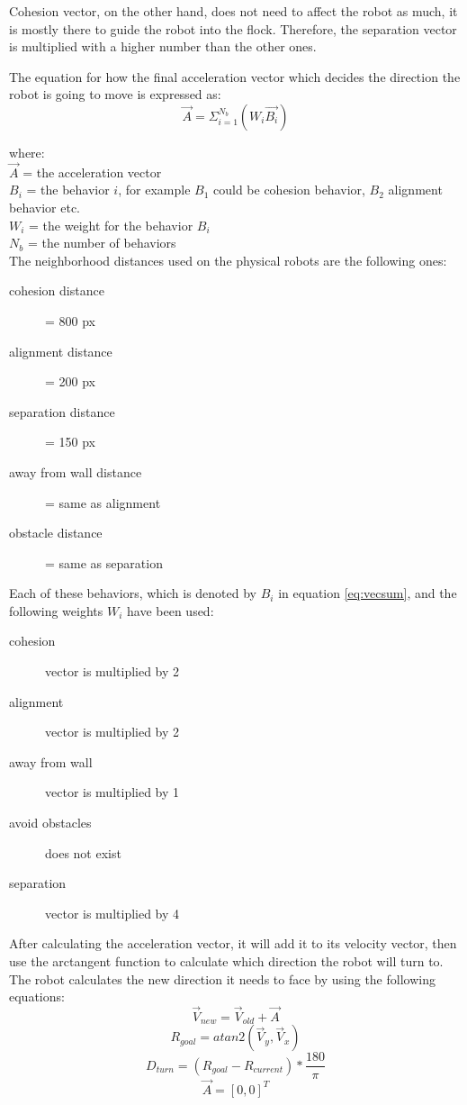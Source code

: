 Cohesion vector, on the other hand, does not need to affect the robot as much, it is mostly there to guide the robot into the flock. Therefore, the separation vector is multiplied with a higher number than the other ones.


The equation for how the final acceleration vector which decides the direction the robot is going to move is expressed as: 
\begin{equation}
\label{eq:vecsum}
\vec{A} = \Sigma_{i=1}^{N_b}(W_i\vec{B_i})
\end{equation}

where:
\\
$\vec{A}$ = the acceleration vector
\\
$B_i$ = the behavior $i$, for example $B_1$ could be cohesion behavior, $B_2$ alignment behavior etc.
\\
$W_i$ = the weight for the behavior $B_i$\\
$N_b$ = the number of behaviors\\

The neighborhood distances used on the physical robots are the following ones:
\begin{description}
\item[cohesion distance] = 800 px
\item[alignment distance] = 200 px
\item[separation distance] = 150 px
\item[away from wall distance] = same as alignment
\item[obstacle distance] = same as separation
\end{description}

Each of these behaviors, which is denoted by $B_i$ in equation \ref{eq:vecsum}, and the following weights $W_i$ have been used:
\begin{description}
\item[cohesion] vector is multiplied by 2
\item[alignment] vector is multiplied by 2
\item[away from wall] vector is multiplied by 1
\item[avoid obstacles] does not exist
\item[separation] vector is multiplied by 4
\end{description}

After calculating the acceleration vector, it will add it to its velocity vector, then use the arctangent function to calculate which direction the robot will turn to. The robot calculates the new direction it needs to face by using the following equations:
\begin{equation}
\label{eq:veladdacc}
\vec{V}_{new} = \vec{V}_{old} + \vec{A}
\end{equation}
\begin{equation}
\label{eq:atan2}
R_{goal} = atan2(\vec{V}_y, \vec{V}_x)
\end{equation}
\begin{equation}
\label{eq:angletoturn}
D_{turn} = (R_{goal} - R_{current})* \frac{180}{\pi}
\end{equation}
\begin{equation}
\label{eq:accelreset}
\vec{A} = [0,0]^T
\end{equation}

